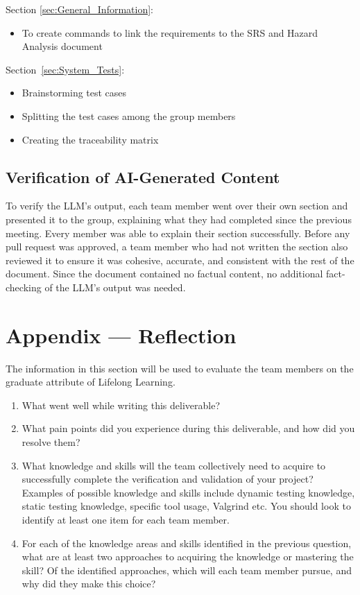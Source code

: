 \documentclass[12pt, titlepage]{article}
\renewcommand{\_}{\oldunderscore\allowbreak}
\begin{document}
Section \ref{sec:General_Information}:
\begin{itemize}
  \item To create commands to link the requirements to the SRS and Hazard Analysis document
\end{itemize}

Section~\ref{sec:System_Tests}:
\begin{itemize}
  \item Brainstorming test cases
  \item Splitting the test cases among the group members
  \item Creating the traceability matrix 
\end{itemize}

\subsection{Verification of AI-Generated Content}

To verify the LLM's output, each team member went over their own section and presented it to the group, explaining what they had completed since the previous meeting. 
Every member was able to explain their section successfully. 
Before any pull request was approved, a team member who had not written the section also reviewed it to ensure it was cohesive, accurate, and consistent with the rest of the document. 
Since the document contained no factual content, no additional fact-checking of the LLM's output was needed.

\newpage{}

\section{Appendix --- Reflection}

The information in this section will be used to evaluate the team members on the
graduate attribute of Lifelong Learning.



\begin{enumerate}
  \item What went well while writing this deliverable? 
  \item What pain points did you experience during this deliverable, and how
    did you resolve them?
  \item What knowledge and skills will the team collectively need to acquire to
  successfully complete the verification and validation of your project?
  Examples of possible knowledge and skills include dynamic testing knowledge,
  static testing knowledge, specific tool usage, Valgrind etc.  You should look to
  identify at least one item for each team member.
  \item For each of the knowledge areas and skills identified in the previous
  question, what are at least two approaches to acquiring the knowledge or
  mastering the skill?  Of the identified approaches, which will each team
  member pursue, and why did they make this choice?
\end{enumerate}
\end{document}
